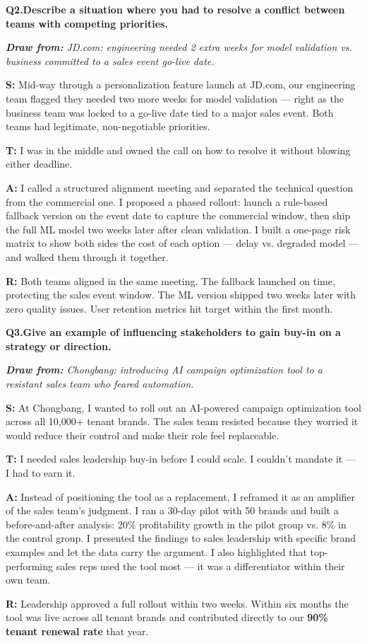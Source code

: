 \documentclass[10pt, letterpaper]{article}
\newcommand{\q}[2]{%
    \smallskip
    \noindent\textbf{\small Q#1.}\quad\textbf{#2}
    \vspace{3pt}
}
\newcommand{\hint}[1]{%
    \begin{notebox}
    \footnotesize\textit{\textbf{Draw from:} #1}
    \end{notebox}
}
\newcommand{\s}[1]{\textbf{\textcolor{starlabel}{S:}} #1}
\newcommand{\ta}[1]{\textbf{\textcolor{starlabel}{T:}} #1}
\newcommand{\ac}[1]{\textbf{\textcolor{starlabel}{A:}} #1}
\newcommand{\res}[1]{\textbf{\textcolor{starlabel}{R:}} #1}
\begin{document}
\q{2}{Describe a situation where you had to resolve a conflict between teams with competing priorities.}
\hint{JD.com: engineering needed 2 extra weeks for model validation vs. business committed to a sales event go-live date.}

\begin{answerbox}
\footnotesize
\s{Mid-way through a personalization feature launch at JD.com, our engineering team flagged they needed two more weeks for model validation --- right as the business team was locked to a go-live date tied to a major sales event. Both teams had legitimate, non-negotiable priorities.}

\medskip
\ta{I was in the middle and owned the call on how to resolve it without blowing either deadline.}

\medskip
\ac{I called a structured alignment meeting and separated the technical question from the commercial one. I proposed a phased rollout: launch a rule-based fallback version on the event date to capture the commercial window, then ship the full ML model two weeks later after clean validation. I built a one-page risk matrix to show both sides the cost of each option --- delay vs. degraded model --- and walked them through it together.}

\medskip
\res{Both teams aligned in the same meeting. The fallback launched on time, protecting the sales event window. The ML version shipped two weeks later with zero quality issues. User retention metrics hit target within the first month.}
\end{answerbox}

\q{3}{Give an example of influencing stakeholders to gain buy-in on a strategy or direction.}
\hint{Chongbang: introducing AI campaign optimization tool to a resistant sales team who feared automation.}

\begin{answerbox}
\footnotesize
\s{At Chongbang, I wanted to roll out an AI-powered campaign optimization tool across all 10,000+ tenant brands. The sales team resisted because they worried it would reduce their control and make their role feel replaceable.}

\medskip
\ta{I needed sales leadership buy-in before I could scale. I couldn't mandate it --- I had to earn it.}

\medskip
\ac{Instead of positioning the tool as a replacement, I reframed it as an amplifier of the sales team's judgment. I ran a 30-day pilot with 50 brands and built a before-and-after analysis: 20\% profitability growth in the pilot group vs. 8\% in the control group. I presented the findings to sales leadership with specific brand examples and let the data carry the argument. I also highlighted that top-performing sales reps used the tool most --- it was a differentiator within their own team.}

\medskip
\res{Leadership approved a full rollout within two weeks. Within six months the tool was live across all tenant brands and contributed directly to our \textbf{90\% tenant renewal rate} that year.}
\end{answerbox}
\end{document}
